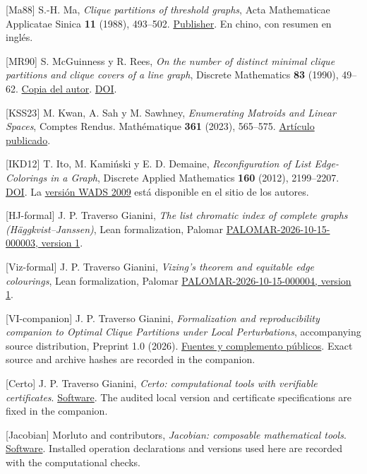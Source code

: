 \documentclass[spanish,11pt,a4paper]{article}
\begin{document}
{[}Ma88{]} S.-H. Ma, \emph{Clique partitions of threshold graphs}, Acta
Mathematicae Applicatae Sinica \textbf{11} (1988), 493--502.
\href{https://applmath.cjoe.ac.cn/jweb_yysxxb/EN/10.12387/C1988054}{Publisher}.
En chino, con resumen en inglés.

{[}MR90{]} S. McGuinness y R. Rees, \emph{On the number of distinct
minimal clique partitions and clique covers of a line graph}, Discrete
Mathematics \textbf{83} (1990), 49--62.
\href{https://faculty.tru.ca/smcguinness/cliquecoverslinegraph.pdf}{Copia
del autor}. \href{https://doi.org/10.1016/0012-365X(90)90220-C}{DOI}.

{[}KSS23{]} M. Kwan, A. Sah y M. Sawhney, \emph{Enumerating Matroids and
Linear Spaces}, Comptes Rendus. Mathématique \textbf{361} (2023),
565--575.
\href{https://numdam.org/articles/10.5802/crmath.423/}{Artículo
publicado}.

{[}IKD12{]} T. Ito, M. Kamiński y E. D. Demaine, \emph{Reconfiguration
of List Edge-Colorings in a Graph}, Discrete Applied Mathematics
\textbf{160} (2012), 2199--2207.
\href{https://doi.org/10.1016/j.dam.2012.05.014}{DOI}. La
\href{https://erikdemaine.org/papers/NPReconfiguration_WADS2009/paper.pdf}{versión
WADS 2009} está disponible en el sitio de los autores.

{[}HJ-formal{]} J. P. Traverso Gianini, \emph{The list chromatic index
of complete graphs (Häggkvist--Janssen)}, Lean formalization, Palomar
\href{https://palomar-registry.org/entry.html?id=PALOMAR-2026-10-15-000003&version=1}{PALOMAR-2026-10-15-000003,
version 1}.

{[}Viz-formal{]} J. P. Traverso Gianini, \emph{Vizing's theorem and
equitable edge colourings}, Lean formalization, Palomar
\href{https://palomar-registry.org/entry.html?id=PALOMAR-2026-10-15-000004&version=1}{PALOMAR-2026-10-15-000004,
version 1}.

{[}VI-companion{]} J. P. Traverso Gianini, \emph{Formalization and
reproducibility companion to Optimal Clique Partitions under Local
Perturbations}, accompanying source distribution, Preprint 1.0 (2026).
\href{https://github.com/jtraverso/erdos-81-chordal-clique-partitions/tree/main/preprints/PAPER_VI/05_formalization}{Fuentes
y complemento públicos}. Exact source and archive hashes are recorded in
the companion.

{[}Certo{]} J. P. Traverso Gianini, \emph{Certo: computational tools
with verifiable certificates}.
\href{https://github.com/jtraverso/certo-math}{Software}. The audited
local version and certificate specifications are fixed in the companion.

{[}Jacobian{]} Morluto and contributors, \emph{Jacobian: composable
mathematical tools}.
\href{https://github.com/morluto/jacobian}{Software}. Installed
operation declarations and versions used here are recorded with the
computational checks.
\end{document}
